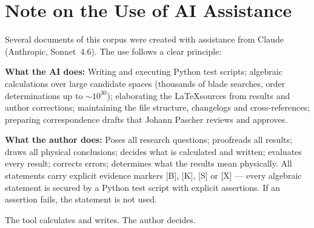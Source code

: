 \documentclass[11pt,oneside]{book}
\begin{document}
\section*{Note on the Use of AI Assistance}

Several documents of this corpus were created with assistance from Claude
(Anthropic, Sonnet~4.6). The use follows a clear principle:

\textbf{What the AI does:} Writing and executing Python test scripts;
algebraic calculations over large candidate spaces (thousands of blade
searches, order determinations up to $\sim 10^{30}$); elaborating the
\LaTeX sources from results and author corrections; maintaining the file
structure, changelogs and cross-references; preparing correspondence drafts
that Johann Pascher reviews and approves.

\textbf{What the author does:} Poses all research questions; proofreads all
results; draws all physical conclusions; decides what is calculated and
written; evaluates every result; corrects errors; determines what the
results mean physically. All statements carry explicit evidence markers
[B], [K], [S] or [X] — every algebraic statement is secured by a Python
test script with explicit assertions. If an assertion fails, the statement
is not used.

The tool calculates and writes. The author decides.
\end{document}
